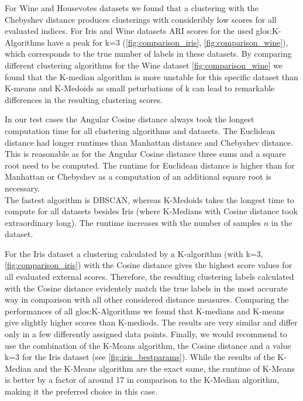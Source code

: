 


For Wine and Housevotes datasets we found that a clustering with the Chebyshev distance produces clusterings with consideribly low scores for all evaluated indices. 
For Iris and Wine datasets ARI scores for the used \Gls{glos:K-Algorithms} have a peak for k=3 (\autoref{fig:comparison_iris}, \autoref{fig:comparison_wine}), which corresponds to the true number of labels in these datasets.  
By comparing different clustering algorithms for the Wine dataset \autoref{fig:comparison_wine} we found that the K-median algorithm is more unstable for this specific dataset than K-means and K-Medoids as small peturbations of k can lead to remarkable differences in the resulting clustering scores. 

In our test cases the Angular Cosine distance always took the longest computation time for all clustering algorithms and datasets. The Euclidean distance had longer runtimes than Manhattan distance and Chebyshev distance. This is reasonable as for the Angular Cosine distance three sums and a square root need to be computed. The runtime for Euclidean distance is higher than for Manhattan or Chebyshev as a computation of an additional square root is necessary.\\
The fastest algorithm is DBSCAN, whereas K-Medoids takes the longest time to compute for all datasets besides Iris (where K-Medians with Cosine distance took extraordinary long). The runtime increases with the number of samples $n$ in the dataset. 

For the Iris dataset a clustering calculated by a K-algorithm (with k=3, \autoref{fig:comparison_iris}) with the Cosine distance gives the highest score values for all evaluated external scores. Therefore, the resulting clustering labels calculated with the Cosine distance evidentely match the true labels in the most accurate way in comparison with all other considered distance measures. Comparing the performances of all \Gls{glos:K-Algorithms} we found that K-medians and K-means give slightly higher scores than K-mediods. The results are very similar and differ only in a few differently assigned data points.
Finally, we would recommend to use the combination of the K-Means algorithm, the Cosine distance and a value k=3 for the Iris dataset (see \autoref{fig:iris_bestparams}). While the results of the K-Median and the K-Means algorithm are the exact same, the runtime of K-Means is better by a factor of around 17 in comparison to the K-Median algorithm, making it the preferred choice in this case. \\

